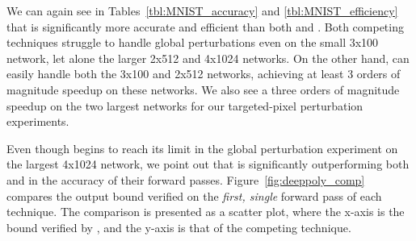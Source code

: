 \begin{table}
\centering
\caption{Efficiency comparison of the three tools on MNIST.}
\label{tbl:MNIST_efficiency}
\end{table}


We can again see in Tables~\ref{tbl:MNIST_accuracy}
and \ref{tbl:MNIST_efficiency} that \diffNN{} is significantly more
accurate and efficient than both \ReluVal{} and \DeepPoly{}.
%
Both competing techniques struggle to handle global perturbations even
on the small 3x100 network, let alone the larger 2x512 and 4x1024 networks.
%
On the other hand, \diffNN{} can easily handle both the 3x100 and 2x512 networks,
achieving at least 3 orders of magnitude speedup on these networks.
%
We also see a three orders of magnitude speedup on the two largest networks
for our targeted-pixel perturbation experiments.

Even though \diffNN{} begins to reach its limit in the global perturbation experiment
on the largest 4x1024 network, we point out that \diffNN{} is significantly outperforming
both \DeepPoly{} and \ReluVal{} in the accuracy of their forward passes.
%
Figure~\ref{fig:deeppoly_comp} compares the output bound verified on the
\textit{first, single} forward pass of each technique.
%
The comparison is presented as a scatter plot, where the x-axis is the
bound verified by \diffNN{}, and the y-axis is that of the competing technique.

